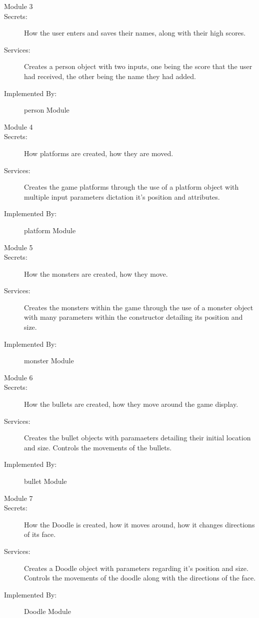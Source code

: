 \documentclass[12pt, titlepage]{article}
\begin{document}
\begin{description}
\item[Module 3]
\item[Secrets:]How the user enters and saves their names, along with their high scores.
\item[Services:]Creates a person object with two inputs, one being the score that the user had received, the other being the name they had added.
\item[Implemented By:] person Module
\end{description}

\begin{description}
\item[Module 4]
\item[Secrets:]How platforms are created, how they are moved.
\item[Services:]Creates the game platforms through the use of a platform object with multiple input parameters dictation it's position and attributes.
\item[Implemented By:] platform Module
\end{description}

\begin{description}
\item[Module 5]
\item[Secrets:]How the monsters are created, how they move.
\item[Services:]Creates the monsters within the game through the use of a monster object with many parameters within the constructor detailing its position and size. 
\item[Implemented By:] monster Module
\end{description}

\begin{description}
\item[Module 6]
\item[Secrets:]How the bullets are created, how they move around the game display. 
\item[Services:]Creates the bullet objects with paramaeters detailing their initial location and size. Controls the movements of the bullets.
\item[Implemented By:] bullet Module
\end{description}

\begin{description}
\item[Module 7]
\item[Secrets:]How the Doodle is created, how it moves around, how it changes directions of its face.
\item[Services:]Creates a Doodle object with parameters regarding it's position and size. Controls the movements of the doodle along with the directions of the face.
\item[Implemented By:] Doodle Module
\end{description}
\end{document}
